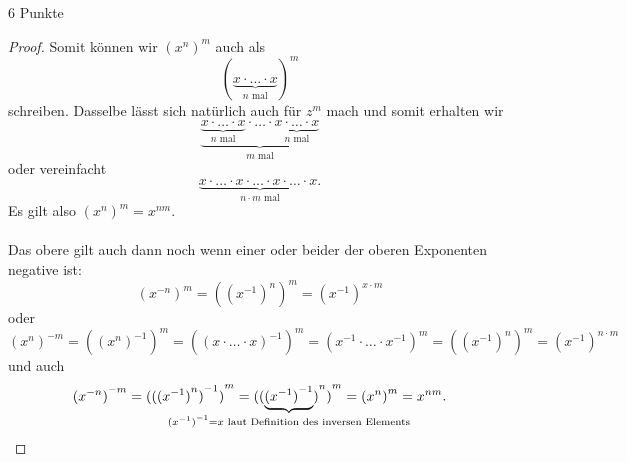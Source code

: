 \documentclass{problemset}
\begin{document}
\begin{problem}{6 Punkte}
\begin{proof}
    Somit können wir ${(x^n)}^m$ auch als \[
        (\underbrace{x \cdot \ldots \cdot x}_{n\text{ mal}})^m
    \] schreiben. Dasselbe lässt sich natürlich auch für $z^m$ mach und somit erhalten
    wir \[
        \underbrace{
        \underbrace{
            x \cdot \ldots \cdot x
        }_{n\text{ mal}
        } \cdot \ldots \cdot \underbrace{
            x \cdot \ldots \cdot x
        }_{n\text{ mal}}
        }_{m\text{ mal}}
    \] oder vereinfacht \[
        \underbrace{
            x \cdot \ldots \cdot x \cdot \ldots \cdot x \cdot \ldots \cdot x.
        }_{n \cdot m\text{ mal}}
    \]
    Es gilt also ${(x^n)}^m = x^{nm}$. \\ \\ Das obere gilt auch dann noch wenn
    einer oder beider der oberen Exponenten negative ist: \[
        {(x^{-n})}^m = {({(x^{-1})}^n)}^m = {(x^{-1})}^{x \cdot m}
    \] oder \[
        {(x^{n})}^{-m} = {({(x^n)}^{-1})}^m = {({(x \cdot \ldots \cdot x)}^{-1})}^m = {(x^{-1} \cdot \ldots \cdot x^{-1})}^m = {({(x^{-1})}^n)}^m = {(x^{-1})}^{n \cdot m}
    \] und auch \[
        {(x^{-n})}^{-m} = {({({(x^{-1})}^n)}^{-1})}^m = {({(\underbrace{{(x^{-1})}^{-1}}_{\mathclap{{(x^{-1})}^{-1} = x \text{ laut Definition des inversen Elements}}})}^n)}^m = {({x}^n)}^m = x^{nm}.
    \]
\end{proof}
\end{problem}
\end{document}
